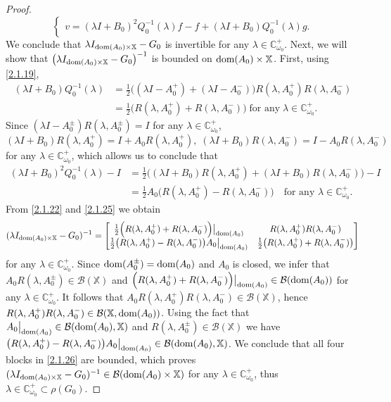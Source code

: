 \documentclass[10pt,a4paper]{amsart}
\newcommand{\CC}{{\mathbb C}}
\newcommand\bX{{\mathbb X}}
\newcommand{\dom}{\text{\rm{dom}}}
\begin{document}
\begin{proof}
\begin{equation}
\begin{cases}
			v=(\lambda I+B_0)^2Q_0^{-1}(\lambda)f-f+(\lambda I+B_0)Q_0^{-1}(\lambda)g.
		\end{cases}
	\end{equation}
	We conclude that $\lambda I_{\dom(A_0)\times \bX}-G_0$ is invertible for any $\lambda\in\mathbb{C}_{\omega_0}^+$. Next, we will show that $\big(\lambda I_{\dom(A_0)\times \bX}-G_0\big)^{-1}$ is bounded on $\dom(A_0)\times\bX$. First, using \eqref{2.1.19},
	\begin{align}\label{2.1.23}
		(\lambda I+B_0)Q_0^{-1}(\lambda)&=\tfrac{1}{2}\Big((\lambda I-A_0^+)+(\lambda I-A_0^-)\Big)R(\lambda,A_0^+)R(\lambda,A_0^-)\nonumber\\
		&=\tfrac{1}{2}\Big(R(\lambda,A_0^+)+R(\lambda,A_0^-)\Big)\;\mbox{for any}\;\lambda\in\CC_{\omega_0}^+.
	\end{align}	
	Since $(\lambda I-A_0^\pm)R(\lambda,A_0^\pm)=I$ for any $\lambda\in\CC_{\omega_0}^+$, 
	\begin{equation}\label{2.1.24}
		(\lambda I+B_0)R(\lambda,A_0^+)=I+A_0 R(\lambda,A_0^+),\;(\lambda I+B_0)R(\lambda,A_0^-)=I-A_0 R(\lambda,A_0^-)
	\end{equation}
	for any $\lambda\in\CC_{\omega_0}^+$, which allows us to conclude that 
	\begin{align}\label{2.1.25}
		(\lambda I+B_0)^2Q_0^{-1}(\lambda)-I&=\tfrac{1}{2}\Big((\lambda I+B_0)R(\lambda,A_0^+)+(\lambda I+B_0)R(\lambda,A_0^-)\Big)-I\nonumber\\
		&= \tfrac{1}{2}A_0\Big( R(\lambda,A_0^+)-R(\lambda,A_0^-)\Big)\quad\text{for any }\lambda\in\mathbb{C}_{\omega_0}^+.
	\end{align}
	From \eqref{2.1.22} and \eqref{2.1.25} we obtain 
	\begin{equation}\label{2.1.26}
		(\lambda I_{\dom(A_0)\times\bX}-G_0)^{-1}
		=\begin{bmatrix}
			\tfrac{1}{2}\Big(R(\lambda,A_0^+)+R(\lambda,A_0^-)\Big)\big|_{\dom(A_0)} &
			R(\lambda,A_0^+)R(\lambda,A_0^-)\\
			\tfrac{1}{2}\big(R(\lambda,A_0^+)-R(\lambda,A_0^-)\big)A_0\big|_{\dom(A_0)} &
			\tfrac{1}{2}\big(R(\lambda,A_0^+)+R(\lambda,A_0^-)\big)
		\end{bmatrix}
	\end{equation}
	for any $\lambda\in\CC_{\omega_0}^+$. Since $\dom(A_0^\pm)=\dom(A_0)$ and $A_0$ is closed, we infer that
	$A_0 R(\lambda,A_0^\pm)\in\mathcal{B}(\bX)$ and $\Big(R(\lambda,A_0^+)+R(\lambda,A_0^-)\Big)\big|_{\dom(A_0)}\in\mathcal{B}(\dom(A_0))$ for any $\lambda\in\CC_{\omega_0}^+$. It follows that $A_0R(\lambda,A_0^+)R(\lambda,A_0^-)\in\mathcal{B}(\bX)$, hence $R(\lambda,A_0^+)R(\lambda,A_0^-)\in\mathcal{B}(\bX,\dom(A_0))$. Using the fact that $A_0\big|_{\dom(A_0)}\in\mathcal{B}(\dom(A_0),\bX)$ and $R(\lambda,A_0^\pm)\in\mathcal{B}(\bX)$ we have $\big(R(\lambda,A_0^+)-R(\lambda,A_0^-)\big)A_0\big|_{\dom(A_0)}\in\mathcal{B}(\dom(A_0),\bX)$. We conclude that all four blocks in \eqref{2.1.26} are bounded, which proves 
	$(\lambda I_{\dom(A_0)\times \bX}-G_0)^{-1}\in\mathcal{B}(\dom(A_0)\times \bX)$ for any $\lambda\in\CC_{\omega_0}^+$, thus $\lambda\in\CC_{\omega_0}^+\subset\rho(G_0)$.
	

\end{proof}
\end{document}

